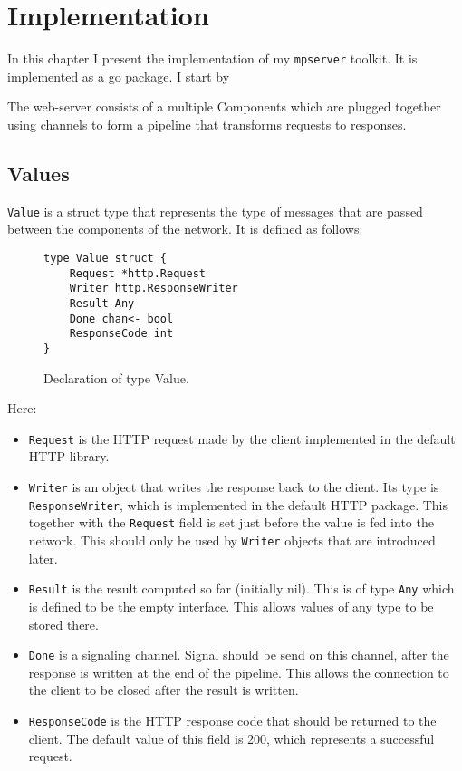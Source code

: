 \documentclass[12pt,a4paper]{article}
\begin{document}
\newpage
\section{Implementation}
\label{sec:impl}
In this chapter I present the implementation of my \texttt{mpserver} toolkit.
It is implemented as a go package. I start by

The web-server consists of a multiple Components which are plugged 
together using channels to form a pipeline that transforms requests 
to responses.

\subsection{Values}
\texttt{Value} is a struct type that represents the type of messages that are
passed between the components of the network. It is defined as follows:

\begin{figure}[h]
\centering
\begin{lstlisting}
type Value struct {
    Request *http.Request
    Writer http.ResponseWriter
    Result Any
    Done chan<- bool
    ResponseCode int
}
\end{lstlisting}
\caption[scale=1.0]{Declaration of type Value.}
\label{fig:Value}
\end{figure}

Here:
\begin{itemize}
  \item \texttt{Request} is the HTTP request made by the client implemented
        in the default HTTP library.

  \item \texttt{Writer} is an object that writes the response back to the client.
        Its type is \texttt{ResponseWriter}, which is implemented in the default HTTP
        package. This together with the \texttt{Request} field is set just before
        the value is fed into the network.
        This should only be used by \texttt{Writer} objects that are introduced later.


  \item \texttt{Result} is the result computed so far (initially nil). This is
        of type \texttt{Any} which is defined to be the empty interface.
        This allows values of any type to be stored there.

  \item \texttt{Done} is a signaling channel. Signal should be send on this channel,
		after the response is written at the end of the pipeline. This
        allows the connection to the client to be closed after the result
        is written.

  \item \texttt{ResponseCode} is the HTTP response code that should be 
        returned to the client. The default value of this field is 200,
        which represents a successful request.
\end{itemize}
\end{document}
